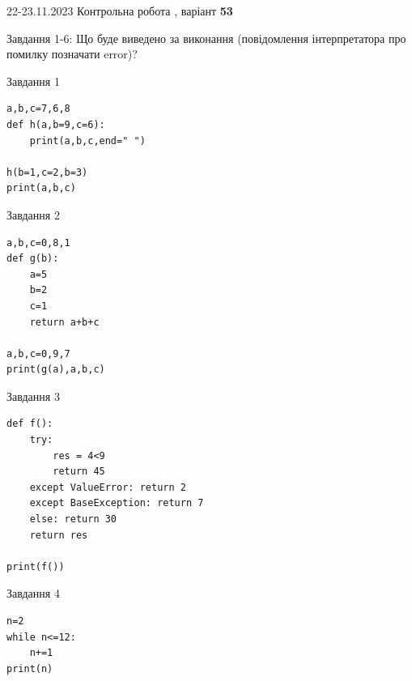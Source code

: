 \documentclass[12pt, ukrainian]{article}
\begin{document}
{{22-23.11.2023 Контрольна робота , варіант  \No \textbf { 53 }\par}}
{

Завдання 1-6: Що буде виведено за виконання (повідомлення інтерпретатора про помилку позначати error)?


\begin{minipage}[t]{9.7cm}                
{\begin{center}Завдання {1}\end{center}}
\begin{verbatim}
a,b,c=7,6,8
def h(a,b=9,c=6):
    print(a,b,c,end=" ")

h(b=1,c=2,b=3)
print(a,b,c)
\end{verbatim}     
\end{minipage}
\vline \hspace{8mm}
\begin{minipage}[t]{8.0cm}                
{\begin{center}Завдання {2}\end{center}}
\begin{verbatim}
a,b,c=0,8,1
def g(b):
    a=5
    b=2
    c=1
    return a+b+c

a,b,c=0,9,7
print(g(a),a,b,c)
\end{verbatim}     
\end{minipage}

\vspace{15mm}
\begin{minipage}[t]{9.7cm}                
{\begin{center}Завдання {3}\end{center}}
\begin{verbatim}
def f():
    try:
        res = 4<9
        return 45
    except ValueError: return 2
    except BaseException: return 7
    else: return 30
    return res

print(f())
\end{verbatim}     
\end{minipage}
\vline \hspace{8mm}
\begin{minipage}[t]{8.0cm}                
{\begin{center}Завдання {4}\end{center}}
\begin{verbatim}
n=2
while n<=12:
    n+=1
print(n)
\end{verbatim}     
\end{minipage}

}
\end{document}
